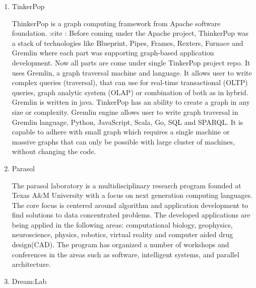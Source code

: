 \begin{enumerate}
\item {} 
TinkerPop

ThinkerPop is a graph computing framework from Apache software
foundation. :cite : Before coming under the
Apache project, ThinkerPop was a stack of technologies like
Blueprint, Pipes, Frames, Rexters, Furnace and Gremlin where each
part was supporting graph-based application development. Now all
parts are come under single TinkerPop project
repo. \label{\detokenize{i524/technologies:id117}}{\hyperref[\detokenize{i524/technologies:www-news}]{\sphinxcrossref{{[}104{]}}}} It uses Gremlin, a graph traversal machine
and language. It allows user to write complex queries (traversal),
that can use for real-time transactional (OLTP) queries, graph
analytic system (OLAP) or combination of both as in
hybrid. Gremlin is written in
java. \label{\detokenize{i524/technologies:id118}}{\hyperref[\detokenize{i524/technologies:www-apachetinkerpophome}]{\sphinxcrossref{{[}105{]}}}} TinkerPop has an ability to
create a graph in any size or complexity. Gremlin engine allows
user to write graph traversal in Gremlin language, Python,
JavaScript, Scala, Go, SQL and SPARQL. It is capable to adhere
with small graph which requires a single machine or massive graphs
that can only be possible with large cluster of machines, without
changing the code.

\item {} 
Parasol

The parasol laboratory is a multidisciplinary research program
founded at Texas A\&M University with a focus on next generation
computing languages.  The core focus is centered around algorithm
and application development to find solutions to data concentrated
problems. \label{\detokenize{i524/technologies:id119}}{\hyperref[\detokenize{i524/technologies:www-parasol}]{\sphinxcrossref{{[}106{]}}}} The developed applications are being
applied in the following areas: computational biology, geophysics,
neuroscience, physics, robotics, virtual reality and computer aided
drug design(CAD).  The program has organized a number of workshops
and conferences in the areas such as software, intelligent systems,
and parallel architecture.

\item {} 
Dream:Lab


\end{enumerate}
